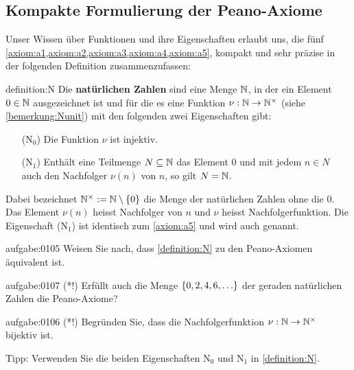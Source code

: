 \subsection{Kompakte Formulierung der Peano-Axiome}\label{subsec:kompakt}
Unser Wissen über Funktionen und ihre Eigenschaften erlaubt uns, die fünf \cref{axiom:a1,axiom:a2,axiom:a3,axiom:a4,axiom:a5}, kompakt und sehr präzise in der folgenden Definition zusammenzufassen:
\begin{definition}{definition:N}
Die \textbf{natürlichen Zahlen} sind eine Menge $\mathbb{N}$, in der ein Element $0\in\mathbb{N}$ ausgezeichnet ist und für die es eine Funktion $\nu:\mathbb{N}\to\mathbb{N}^{\times}$ (siehe \cref{bemerkung:Nunit}) mit den folgenden zwei Eigenschaften gibt:
\begin{itemize}
  \item[(N$_0$)] Die Funktion $\nu$ ist injektiv.
  \item[(N$_1$)] Enthält eine Teilmenge $N\subseteq\mathbb{N}$ das Element $0$ und mit jedem $n\in N$ auch den Nachfolger $\nu(n)$ von $n$, so gilt $N=\mathbb{N}$.
\end{itemize}
\end{definition}
Dabei bezeichnet $\mathbb{N}^{\times}:=\mathbb{N}\setminus{\left\{0\right\}}$ die Menge der natürlichen Zahlen ohne die $0$. Das Element $\nu(n)$ heisst Nachfolger von $n$ und $\nu$ heisst Nachfolgerfunktion. Die Eigenschaft (N$_1$) ist identisch zum \cref{axiom:a5} und wird auch  genannt.
\begin{aufgabe}{aufgabe:0105}
Weisen Sie nach, dass \cref{definition:N} zu den Peano-Axiomen äquivalent ist.
\end{aufgabe}

\begin{aufgabe}{aufgabe:0107}
(*!) Erfüllt auch die Menge $\left\{0,2,4,6,\ldots\right\}$  der geraden natürlichen Zahlen die Peano-Axiome?
\end{aufgabe}

\begin{aufgabe}{aufgabe:0106}
(*!) Begründen Sie, dass die Nachfolgerfunktion $\nu:\mathbb{N}\to\mathbb{N}^{\times}$ bijektiv ist.

\noindent
Tipp: Verwenden Sie die beiden Eigenschaften N$_0$ und N$_1$ in \cref{definition:N}.
\end{aufgabe}

